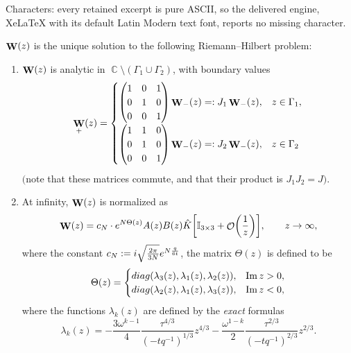 \documentclass[10pt,a4paper]{amsart}
\DeclareMathOperator{\CC}{\mathbb{C}}
\DeclareMathOperator{\OO}{\mathcal{O}}
\DeclareMathOperator{\WW}{{\bf W}}
\begin{document}
Characters: every retained excerpt is pure ASCII, so the delivered engine, XeLaTeX with its default Latin Modern text font, reports no missing character.
 \begin{Proposition} $\WW(z)$ is the unique solution to the following Riemann--Hilbert problem:
 \begin{enumerate}\itemsep=0pt
 \item[$(1)$] $\WW(z)$ is analytic in $\CC \setminus (\Gamma_1\cup \Gamma_2)$, with boundary values
 \begin{equation*}
 \WW_{+}(z) =
 \begin{cases}
 \begin{pmatrix}
 1 & 0 & 1 \\
 0 & 1 & 0 \\
 0 & 0 & 1
 \end{pmatrix}\WW_{-}(z) =: J_1\WW_{-}(z), & z \in \Gamma_1,\\[1.5mm]
 \begin{pmatrix}
 1 & 1 & 0 \\
 0 & 1 & 0 \\
 0 & 0 & 1
 \end{pmatrix}\WW_{-}(z)=: J_2\WW_{-}(z), & z \in \Gamma_2
 \end{cases}
 \end{equation*}
 $($note that these matrices commute, and that their product is $J_1J_2=J)$.
 \item[$(2)$] At infinity, $\WW(z)$ is normalized as
 \begin{equation*}
 \WW(z) = c_N \cdot {\rm e}^{N\Theta(z)} A(z) B(z)\hat{K}\biggl[\mathbb{I}_{3\times 3} + \OO\biggl(\frac{1}{z}\biggr)\biggr], \qquad z\to \infty,
 \end{equation*}
 where the constant $c_N:= {\rm i}\sqrt{\frac{2\pi}{3N}}{\rm e}^{N\frac{q}{6t}}$, the matrix $\Theta(z)$ is defined to be
 \begin{equation} \label{Lambda-Matrix}
 \Theta(z) =
 \begin{cases}
 {\rm diag}(\lambda_3(z), \lambda_1(z),\lambda_2(z)), & \operatorname{Im} z > 0,\\
 {\rm diag}(\lambda_2(z), \lambda_1(z),\lambda_3(z)), & \operatorname{Im} z <0,
 \end{cases} %
 \end{equation}
where the functions $\lambda_k(z)$ are defined by the \textit{exact} formulas
 \begin{equation*}%
 \lambda_k(z) = -\frac{3\omega^{k-1}}{4} \frac{\tau^{4/3}}{(-tq^{-1})^{1/3}}z^{4/3} - \frac{\omega^{1-k}}{2}\frac{\tau^{2/3}}{(-tq^{-1})^{2/3}}z^{2/3}.

\end{equation*}
\end{enumerate}
\end{Proposition}
\end{document}
